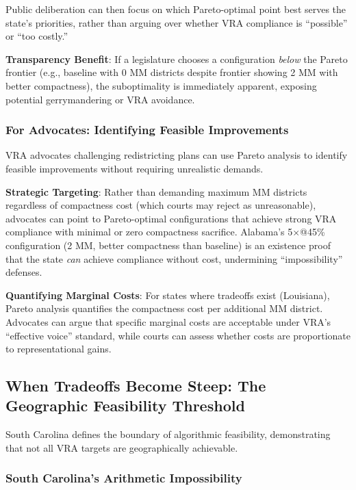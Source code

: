 Public deliberation can then focus on which Pareto-optimal point best serves the state's priorities, rather than arguing over whether VRA compliance is ``possible'' or ``too costly.''

\textbf{Transparency Benefit}: If a legislature chooses a configuration \emph{below} the Pareto frontier (e.g., baseline with 0 MM districts despite frontier showing 2 MM with better compactness), the suboptimality is immediately apparent, exposing potential gerrymandering or VRA avoidance.

\subsubsection{For Advocates: Identifying Feasible Improvements}

VRA advocates challenging redistricting plans can use Pareto analysis to identify feasible improvements without requiring unrealistic demands.

\textbf{Strategic Targeting}: Rather than demanding maximum MM districts regardless of compactness cost (which courts may reject as unreasonable), advocates can point to Pareto-optimal configurations that achieve strong VRA compliance with minimal or zero compactness sacrifice. Alabama's 5$\times$@45\% configuration (2 MM, better compactness than baseline) is an existence proof that the state \emph{can} achieve compliance without cost, undermining ``impossibility'' defenses.

\textbf{Quantifying Marginal Costs}: For states where tradeoffs exist (Louisiana), Pareto analysis quantifies the compactness cost per additional MM district. Advocates can argue that specific marginal costs are acceptable under VRA's ``effective voice'' standard, while courts can assess whether costs are proportionate to representational gains.

\subsection{When Tradeoffs Become Steep: The Geographic Feasibility Threshold}

South Carolina defines the boundary of algorithmic feasibility, demonstrating that not all VRA targets are geographically achievable.

\subsubsection{South Carolina's Arithmetic Impossibility}

